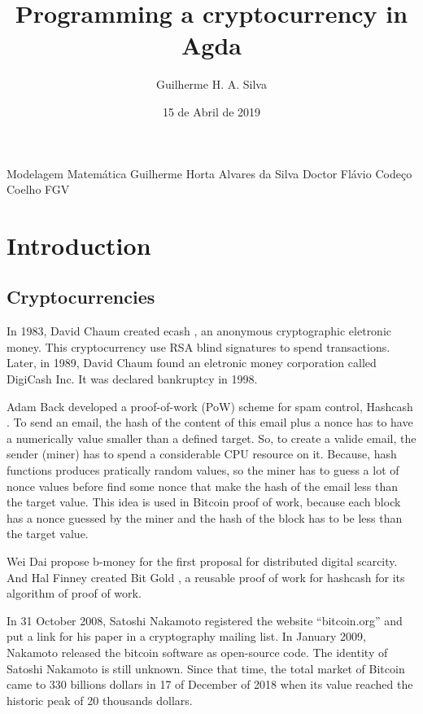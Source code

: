 \documentclass[12pt]{article}
\title{Programming a cryptocurrency in Agda}
\author{Guilherme H. A. Silva}
\date{15 de Abril de 2019}
\begin{document}

          {Modelagem Matemática}
          {Guilherme Horta Alvares da Silva}
          {Doctor Flávio Codeço Coelho}
          {FGV}


\tableofcontents
\pagebreak

\renewcommand{\thesection}{\arabic{section}}
\section{Introduction}

\subsection{Cryptocurrencies}

In 1983, David Chaum created ecash \cite{panurach1996money} , an anonymous cryptographic eletronic money.
This cryptocurrency use RSA blind signatures \cite{chaum1983blind} to spend transactions.
Later, in 1989, David Chaum found an eletronic money corporation called DigiCash Inc.
It was declared bankruptcy in 1998.

Adam Back developed a proof-of-work (PoW) scheme for spam control, Hashcash \cite{back2002hashcash}.
To send an email, the hash of the content of this email plus a nonce has to have a numerically value
smaller than a defined target.
So, to create a valide email, the sender (miner) has to spend a considerable CPU resource on it.
Because, hash functions produces pratically random values, so the miner has to guess a lot of nonce
values before find some nonce that make the hash of the email less than the target value.
This idea is used in Bitcoin proof of work, because each block has a nonce guessed by the miner and
the hash of the block has to be less than the target value.

Wei Dai propose b-money \cite{dai1998b} for the first proposal for distributed digital scarcity.
And Hal Finney created Bit Gold \cite{wallace2011rise}, a reusable proof of work for hashcash for
its algorithm of proof of work.

In 31 October 2008, Satoshi Nakamoto registered the website ``bitcoin.org'' and put a link for his
paper \cite{nakamoto2008bitcoin} in a cryptography mailing list.
In January 2009, Nakamoto released the bitcoin software as open-source code.
The identity of Satoshi Nakamoto is still unknown.
Since that time, the total market of Bitcoin came to 330 billions dollars in 17 of December of 2018
when its value reached the historic peak of 20 thousands dollars.
\end{document}

